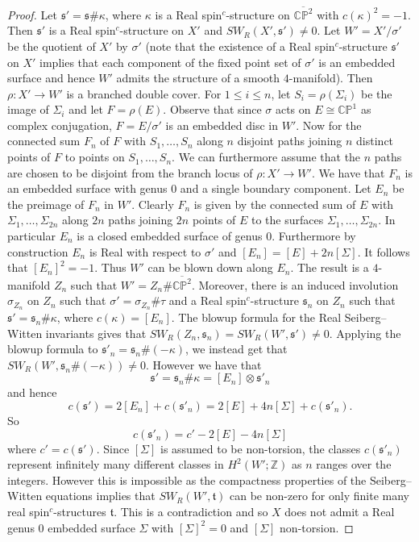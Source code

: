\documentclass{amsart}
\theoremstyle{definition}
\theoremstyle{remark}
\numberwithin{equation}{section}
\begin{document}
\begin{proof}
Let $\mathfrak{s}' = \mathfrak{s} \# \kappa$, where $\kappa$ is a Real spin$^c$-structure on $\overline{\mathbb{CP}^2}$ with $c(\kappa)^2 = -1$. Then $\mathfrak{s}'$ is a Real spin$^c$-structure on $X'$ and $SW_R(X',\mathfrak{s}') \neq 0$. Let $W' = X'/\sigma'$ be the quotient of $X'$ by $\sigma'$ (note that the existence of a Real spin$^c$-structure $\mathfrak{s}'$ on $X'$ implies that each component of the fixed point set of $\sigma'$ is an embedded surface and hence $W'$ admits the structure of a smooth $4$-manifold). Then $\rho : X' \to W'$ is a branched double cover. For $1 \le i \le n$, let $S_i = \rho(\Sigma_i)$ be the image of $\Sigma_i$ and let $F = \rho(E)$. Observe that since $\sigma$ acts on $E \cong \mathbb{CP}^1$ as complex conjugation, $F = E/\sigma'$ is an embedded disc in $W'$. Now for the connected sum $F_n$ of $F$ with $S_1, \dots , S_n$ along $n$ disjoint paths joining $n$ distinct points of $F$ to points on $S_1, \dots , S_n$. We can furthermore assume that the $n$ paths are chosen to be disjoint from the branch locus of $\rho : X' \to W'$. We have that $F_n$ is an embedded surface with genus $0$ and a single boundary component. Let $E_n$ be the preimage of $F_n$ in $W'$. Clearly $F_n$ is given by the connected sum of $E$ with $\Sigma_1, \dots , \Sigma_{2n}$ along $2n$ paths joining $2n$ points of $E$ to the surfaces $\Sigma_1, \dots , \Sigma_{2n}$. In particular $E_n$ is a closed embedded surface of genus $0$. Furthermore by construction $E_n$ is Real with respect to $\sigma'$ and $[E_n] = [E] + 2n[\Sigma]$. It follows that $[E_n]^2 = -1$. Thus $W'$ can be blown down along $E_n$. The result is a $4$-manifold $Z_n$ such that $W' = Z_n \# \overline{\mathbb{CP}^2}$. Moreover, there is an induced involution $\sigma_{Z_n}$ on $Z_n$ such that $\sigma' = \sigma_{Z_n} \# \tau$ and a Real spin$^c$-structure $\mathfrak{s}_n$ on $Z_n$ such that $\mathfrak{s}' = \mathfrak{s}_n \# \kappa$, where $c(\kappa) = [E_n]$. The blowup formula for the Real Seiberg--Witten invariants gives that $SW_R(Z_n , \mathfrak{s}_n) = SW_R(W' , \mathfrak{s}') \neq 0$. Applying the blowup formula to $\mathfrak{s}'_n = \mathfrak{s}_n \# (-\kappa)$, we instead get that $SW_R(W' , \mathfrak{s}_n \# (-\kappa)) \neq 0$. However we have that
\[
\mathfrak{s}' = \mathfrak{s}_n \# \kappa = [E_n] \otimes \mathfrak{s}'_n
\]
and hence
\[
c(\mathfrak{s}') = 2[E_n] + c(\mathfrak{s}'_n) = 2[E] + 4n[\Sigma] + c(\mathfrak{s}'_n).
\]
So
\[
c(\mathfrak{s}'_n) = c' -2[E] - 4n[\Sigma]
\]
where $c' = c(\mathfrak{s}')$. Since $[\Sigma]$ is assumed to be non-torsion, the classes $c(\mathfrak{s}'_n)$ represent infinitely many different classes in $H^2(W' ; \mathbb{Z})$ as $n$ ranges over the integers. However this is impossible as the compactness properties of the Seiberg--Witten equations implies that $SW_R(W' , \mathfrak{t} )$ can be non-zero for only finite many real spin$^c$-structures $\mathfrak{t}$. This is a contradiction and so $X$ does not admit a Real genus $0$ embedded surface $\Sigma$ with $[\Sigma]^2 = 0$ and $[\Sigma]$ non-torsion.
\end{proof}
\end{document}
